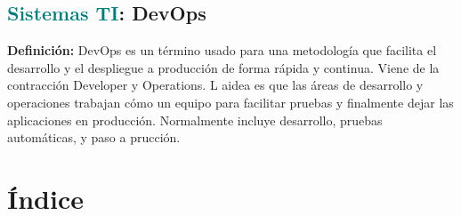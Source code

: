 \documentclass[12pt]{article}
\begin{document}
\subsection{\textcolor{teal}{Sistemas TI}: DevOps}
\textbf{Definición:} DevOps es un término usado para una metodología que  facilita el desarrollo y el despliegue a producción de forma rápida y continua. Viene de la contracción Developer y Operations. L aidea es que las áreas de desarrollo y operaciones trabajan cómo un equipo para facilitar pruebas y finalmente dejar las aplicaciones en producción. Normalmente incluye desarrollo, pruebas automáticas, y paso a prucción.
\newpage
\section*{Índice}
\printindex
\end{document}
